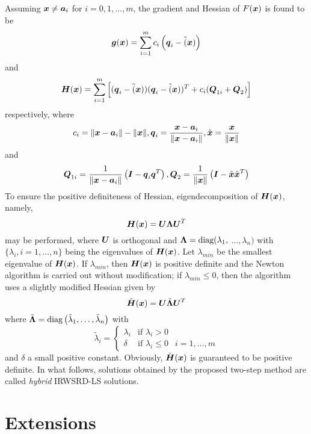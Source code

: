 Assuming $\Bx\neq\Ba_i$ for $i = 0, 1,\ldots, m$, the gradient and Hessian of $F(\Bx)$ is found to be
\begin{equation}
\nonumber
\Bg(\Bx)=\sum_{i=1}^m c_i\left(\Bq_i - \tilde(\Bx)\right)
\end{equation}
and
\begin{equation}
\nonumber
\BH(\Bx)=\sum_{i=1}^m \left[(\Bq_i-\tilde(\Bx))(\Bq_i-\tilde(\Bx))^T+c_i(\BQ_{1i}+\BQ_2)\right]
\end{equation}
respectively, where
\begin{equation}
\nonumber
c_i=\|\Bx-\Ba_i\|-\|\Bx\|, \Bq_i=\frac{\Bx-\Ba_i}{\|\Bx-\Ba_i\|}, \tilde{\Bx}=\frac{\Bx}{\|\Bx\|}
\end{equation}
and
\begin{equation}
\nonumber
\BQ_{1i}=\frac{1}{\|\Bx-\Ba_i\|}\left(\BI-\Bq_i\Bq^T\right), \BQ_2=\frac{1}{\|\Bx\|}\left(\BI-\tilde{\Bx}\tilde{\Bx}^T\right)
\end{equation}
To ensure the positive definiteness of Hessian, eigendecomposition of $\BH(\Bx)$, namely,
\begin{equation}
\nonumber
\BH(\Bx)=\BU\BLA\BU^T
\end{equation}
may be performed, where $\BU$ is orthogonal and $\BLA=\mbox{diag}(\lambda_1,$ $\ldots,\lambda_n)$ with $\{\lambda_i, i=1,\ldots,n\}$ being the eigenvalues of $\BH(\Bx)$. Let $\lambda_{min}$ be the smallest eigenvalue of $\BH(\Bx)$. If $\lambda_{min}$, then $\BH(\Bx)$ is positive definite and the Newton algorithm is carried out without modification; if $\lambda_{min}\leq0$, then the algorithm uses a slightly modified Hessian given by
\begin{equation}
\nonumber
\tilde{\BH}(\Bx)=\BU\tilde{\BLA}\BU^T
\end{equation}
where $\tilde{\BLA}=\mbox{diag}\left(\tilde{\lambda}_1,\ldots,\tilde{\lambda}_n\right)$ with
\begin{equation}
\nonumber
\tilde{\lambda}_i=\left\{\begin{array} {lll}
    \lambda_i & \mbox{if } \lambda_i>0 & \\
    \delta &  \mbox{if } \lambda_i\leq0 & i=1,\ldots,m \end{array} \right.
\end{equation}
and $\delta$ a small positive constant. Obviously, $\tilde{\BH}(\Bx)$ is guaranteed to be positive definite. In what follows, solutions obtained by the proposed two-step method are called \textit{hybrid} IRWSRD-LS solutions.

\section{Extensions}


